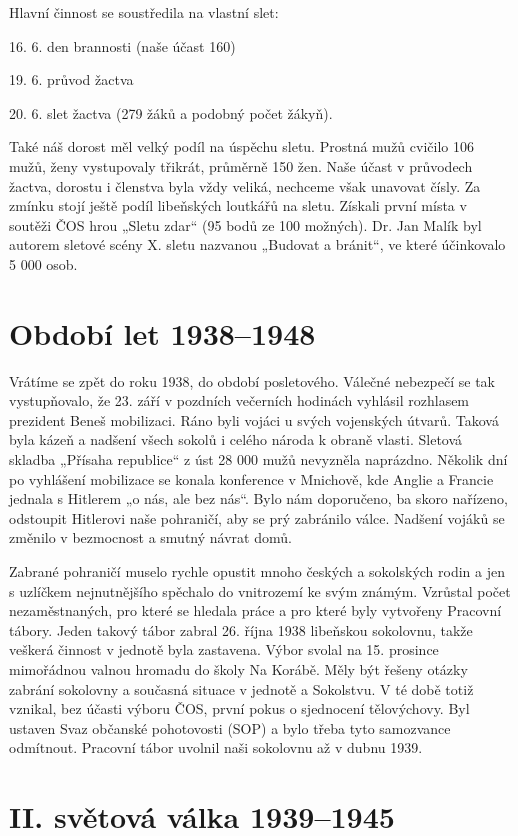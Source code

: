 Hlavní činnost se soustředila na vlastní slet:

16. 6. den brannosti (naše účast 160)

19. 6. průvod žactva

20. 6. slet žactva (279 žáků a podobný počet žákyň).

Také náš dorost měl velký podíl na úspěchu sletu. Prostná mužů cvičilo
106 mužů, ženy vystupovaly třikrát, průměrně 150 žen. Naše účast v
průvodech žactva, dorostu i členstva byla vždy veliká, nechceme však
unavovat čísly. Za zmínku stojí ještě podíl libeňských loutkářů na
sletu. Získali první místa v soutěži ČOS hrou „Sletu zdar`` (95 bodů ze
100 možných). Dr. Jan Malík byl autorem sletové scény X. sletu nazvanou
„Budovat a bránit``, ve které účinkovalo 5 000 osob.

\section{Období let 1938--1948}\label{obdobuxed-let-19381948}

Vrátíme se zpět do roku 1938, do období posletového. Válečné nebezpečí
se tak vystupňovalo, že 23. září v pozdních večerních hodinách vyhlásil
rozhlasem prezident Beneš mobilizaci. Ráno byli vojáci u svých
vojenských útvarů. Taková byla kázeň a nadšení všech sokolů i celého
národa k obraně vlasti. Sletová skladba „Přísaha republice`` z úst 28
000 mužů nevyzněla naprázdno. Několik dní po vyhlášení mobilizace se
konala konference v Mnichově, kde Anglie a Francie jednala s Hitlerem „o
nás, ale bez nás``. Bylo nám doporučeno, ba skoro nařízeno, odstoupit
Hitlerovi naše pohraničí, aby se prý zabránilo válce. Nadšení vojáků se
změnilo v bezmocnost a smutný návrat domů.

Zabrané pohraničí muselo rychle opustit mnoho českých a sokolských rodin
a jen s uzlíčkem nejnutnějšího spěchalo do vnitrozemí ke svým známým.
Vzrůstal počet nezaměstnaných, pro které se hledala práce a pro které
byly vytvořeny Pracovní tábory. Jeden takový tábor zabral 26. října 1938
libeňskou sokolovnu, takže veškerá činnost v jednotě byla zastavena.
Výbor svolal na 15. prosince mimořádnou valnou hromadu do školy Na
Korábě. Měly být řešeny otázky zabrání sokolovny a současná situace v
jednotě a Sokolstvu. V té době totiž vznikal, bez účasti výboru ČOS,
první pokus o sjednocení tělovýchovy. Byl ustaven Svaz občanské
pohotovosti (SOP) a bylo třeba tyto samozvance odmítnout. Pracovní tábor
uvolnil naši sokolovnu až v dubnu 1939.

\section{II. světová válka
1939--1945}\label{ii.-svux11btovuxe1-vuxe1lka-19391945}

